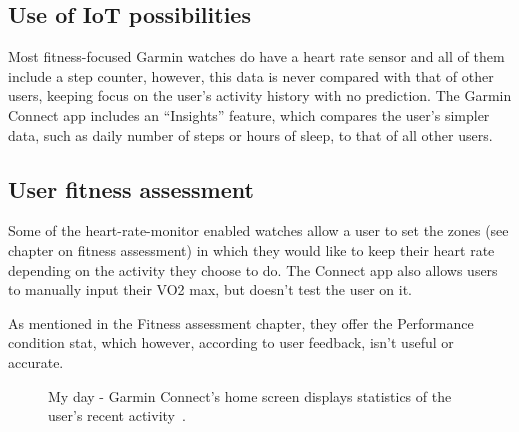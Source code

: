 \subsection*{Use of IoT possibilities}
Most fitness-focused Garmin watches do have a heart rate sensor and all of them include a step counter, however, this data is never compared with that of other users, keeping focus on the user's activity history with no prediction.
The Garmin Connect app includes an ``Insights'' feature, which compares the user's simpler data, such as daily number of steps or hours of sleep, to that of all other users.
\subsection*{User fitness assessment}
Some of the heart-rate-monitor enabled watches allow a user to set the zones (see chapter on fitness assessment) in which they would like to keep their heart rate depending on the activity they choose to do.
The Connect app also allows users to manually input their VO2 max, but doesn't test the user on it.

As mentioned in the Fitness assessment chapter, they offer the Performance condition stat, which however, according to user feedback, isn't useful or accurate.

\begin{figure}[h]
    \centering
        \caption{My day - Garmin Connect's home screen displays statistics of the user's recent activity~\cite{garmin-my-day-img}.}
        \label{garmin-my-day-img}
\end{figure}


